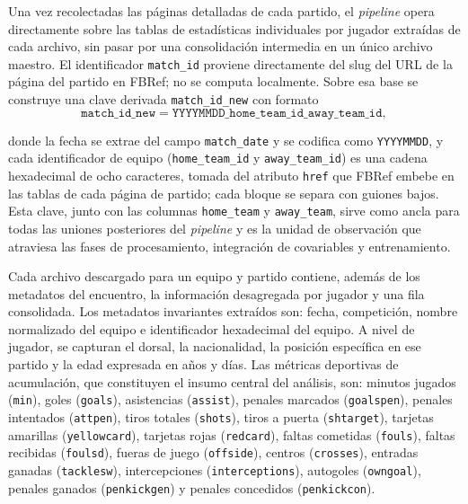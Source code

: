 Una vez recolectadas las p\'aginas detalladas de cada partido, el \textit{pipeline} opera directamente sobre las tablas de estad\'isticas individuales por jugador extra\'idas de cada archivo, sin pasar por una consolidaci\'on intermedia en un \'unico archivo maestro. El identificador \texttt{match\_id} proviene directamente del slug del URL de la p\'agina del partido en FBRef; no se computa localmente. Sobre esa base se construye una clave derivada \texttt{match\_id\_new} con formato
\begin{equation}
	\texttt{match\_id\_new} = \texttt{YYYYMMDD}\_\texttt{home\_team\_id}\_\texttt{away\_team\_id},
	\label{eq:match_id_new}
\end{equation}

donde la fecha se extrae del campo \texttt{match\_date} y se codifica como \texttt{YYYYMMDD}, y cada identificador de equipo (\texttt{home\_team\_id} y \texttt{away\_team\_id}) es una cadena hexadecimal de ocho caracteres, tomada del atributo \texttt{href} que FBRef embebe en las tablas de cada p\'agina de partido; cada bloque se separa con guiones bajos. Esta clave, junto con las columnas \texttt{home\_team} y  \texttt{away\_team}, sirve como ancla para todas las uniones posteriores del \textit{pipeline} y es la unidad de observaci\'on que atraviesa las fases de procesamiento, integraci\'on de covariables y entrenamiento.

Cada archivo descargado para un equipo y partido contiene, adem\'as de los metadatos del encuentro, la informaci\'on desagregada por jugador y una fila consolidada. Los metadatos invariantes extra\'idos son: fecha, competici\'on, nombre normalizado del equipo e identificador hexadecimal del equipo. A nivel de jugador, se capturan el dorsal, la nacionalidad, la posici\'on espec\'ifica en  ese partido y la edad expresada en a\~nos y d\'ias. Las m\'etricas deportivas de acumulaci\'on, que constituyen el insumo central del an\'alisis, son: minutos jugados (\texttt{min}), goles (\texttt{goals}), asistencias (\texttt{assist}), penales  marcados (\texttt{goalspen}), penales intentados (\texttt{attpen}), tiros totales (\texttt{shots}), tiros a puerta (\texttt{shtarget}), tarjetas amarillas (\texttt{yellowcard}), tarjetas rojas  (\texttt{redcard}), faltas cometidas (\texttt{fouls}), faltas recibidas (\texttt{foulsd}), fueras de juego (\texttt{offside}), centros (\texttt{crosses}), entradas ganadas (\texttt{tacklesw}), intercepciones (\texttt{interceptions}), autogoles (\texttt{owngoal}), penales ganados (\texttt{penkickgen}) y penales concedidos (\texttt{penkickcon}).

